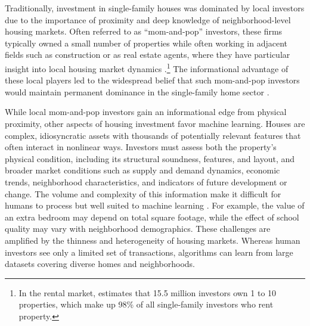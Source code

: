 \documentclass[11pt]{article}
\begin{document}
% 
 
Traditionally, investment in single-family houses was dominated by local investors due to the importance of proximity and deep knowledge of neighborhood-level housing markets. Often referred to as ``mom-and-pop'' investors, these firms typically owned a small number of properties while often working in adjacent fields such as construction or as real estate agents, where they have particular insight into local housing market dynamics \citep{fields2022a}.\footnote{In the rental market, \citet{freddiemac2018} estimates that 15.5 million investors  own 1 to 10 properties, which make up 98\% of all single-family investors who rent property.} The informational advantage of these local players led to the widespread belief that such mom-and-pop investors would maintain permanent dominance in the single-family home sector \citep{fields2018a, americanhomes4rentFormS11}.


While local mom-and-pop investors gain an informational edge from physical proximity, other aspects of housing investment favor machine learning. Houses are complex, idiosyncratic assets with thousands of potentially relevant features that often interact in nonlinear ways. Investors must assess both the property’s physical condition, including its structural soundness, features, and layout, and broader market conditions such as supply and demand dynamics, economic trends, neighborhood characteristics, and indicators of future development or change. The volume and complexity of this information make it difficult for humans to process but well suited to machine learning \citep{kahneman_thinking_2011, athey_impact_2018}. For example, the value of an extra bedroom may depend on total square footage, while the effect of school quality may vary with neighborhood demographics. These challenges are amplified by the thinness and heterogeneity of housing markets. Whereas human investors see only a limited set of transactions, algorithms can learn from large datasets covering diverse homes and neighborhoods.
\end{document}
